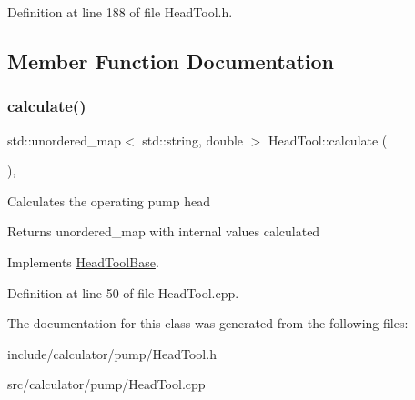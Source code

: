 Definition at line 188 of file Head\+Tool.\+h.



\subsection{Member Function Documentation}
\mbox{\label{class_head_tool_ab107e7717df4ca95404ce1952c21a84e}} 
\subsubsection{\texorpdfstring{calculate()}{calculate()}}
{\footnotesize\ttfamily std\+::unordered\+\_\+map$<$ std\+::string, double $>$ Head\+Tool\+::calculate (\begin{DoxyParamCaption}{ }\end{DoxyParamCaption})\hspace{0.3cm}{\ttfamily [override]}, {\ttfamily [virtual]}}

Calculates the operating pump head

\begin{DoxyReturn}{Returns}
unordered\+\_\+map with internal values calculated 
\end{DoxyReturn}


Implements \hyperlink{class_head_tool_base_ab8df8f908827ce45dc5e769ea0e10f0b}{Head\+Tool\+Base}.



Definition at line 50 of file Head\+Tool.\+cpp.



The documentation for this class was generated from the following files\+:\begin{DoxyCompactItemize}
\item 
include/calculator/pump/Head\+Tool.\+h\item 
src/calculator/pump/Head\+Tool.\+cpp\end{DoxyCompactItemize}

